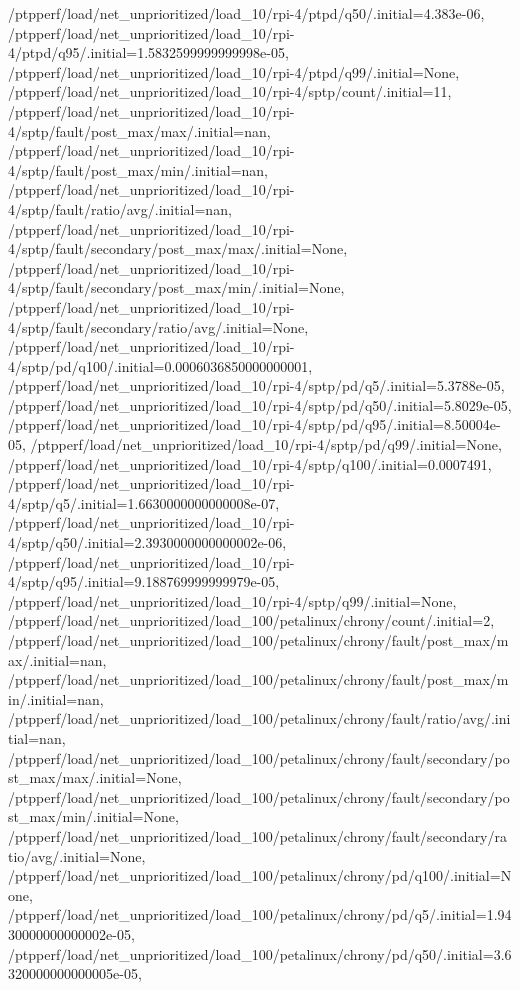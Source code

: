 {    /ptpperf/load/net_unprioritized/load_10/rpi-4/ptpd/q50/.initial=4.383e-06,
    /ptpperf/load/net_unprioritized/load_10/rpi-4/ptpd/q95/.initial=1.5832599999999998e-05,
    /ptpperf/load/net_unprioritized/load_10/rpi-4/ptpd/q99/.initial=None,
    /ptpperf/load/net_unprioritized/load_10/rpi-4/sptp/count/.initial=11,
    /ptpperf/load/net_unprioritized/load_10/rpi-4/sptp/fault/post_max/max/.initial=nan,
    /ptpperf/load/net_unprioritized/load_10/rpi-4/sptp/fault/post_max/min/.initial=nan,
    /ptpperf/load/net_unprioritized/load_10/rpi-4/sptp/fault/ratio/avg/.initial=nan,
    /ptpperf/load/net_unprioritized/load_10/rpi-4/sptp/fault/secondary/post_max/max/.initial=None,
    /ptpperf/load/net_unprioritized/load_10/rpi-4/sptp/fault/secondary/post_max/min/.initial=None,
    /ptpperf/load/net_unprioritized/load_10/rpi-4/sptp/fault/secondary/ratio/avg/.initial=None,
    /ptpperf/load/net_unprioritized/load_10/rpi-4/sptp/pd/q100/.initial=0.0006036850000000001,
    /ptpperf/load/net_unprioritized/load_10/rpi-4/sptp/pd/q5/.initial=5.3788e-05,
    /ptpperf/load/net_unprioritized/load_10/rpi-4/sptp/pd/q50/.initial=5.8029e-05,
    /ptpperf/load/net_unprioritized/load_10/rpi-4/sptp/pd/q95/.initial=8.50004e-05,
    /ptpperf/load/net_unprioritized/load_10/rpi-4/sptp/pd/q99/.initial=None,
    /ptpperf/load/net_unprioritized/load_10/rpi-4/sptp/q100/.initial=0.0007491,
    /ptpperf/load/net_unprioritized/load_10/rpi-4/sptp/q5/.initial=1.6630000000000008e-07,
    /ptpperf/load/net_unprioritized/load_10/rpi-4/sptp/q50/.initial=2.3930000000000002e-06,
    /ptpperf/load/net_unprioritized/load_10/rpi-4/sptp/q95/.initial=9.188769999999979e-05,
    /ptpperf/load/net_unprioritized/load_10/rpi-4/sptp/q99/.initial=None,
    /ptpperf/load/net_unprioritized/load_100/petalinux/chrony/count/.initial=2,
    /ptpperf/load/net_unprioritized/load_100/petalinux/chrony/fault/post_max/max/.initial=nan,
    /ptpperf/load/net_unprioritized/load_100/petalinux/chrony/fault/post_max/min/.initial=nan,
    /ptpperf/load/net_unprioritized/load_100/petalinux/chrony/fault/ratio/avg/.initial=nan,
    /ptpperf/load/net_unprioritized/load_100/petalinux/chrony/fault/secondary/post_max/max/.initial=None,
    /ptpperf/load/net_unprioritized/load_100/petalinux/chrony/fault/secondary/post_max/min/.initial=None,
    /ptpperf/load/net_unprioritized/load_100/petalinux/chrony/fault/secondary/ratio/avg/.initial=None,
    /ptpperf/load/net_unprioritized/load_100/petalinux/chrony/pd/q100/.initial=None,
    /ptpperf/load/net_unprioritized/load_100/petalinux/chrony/pd/q5/.initial=1.9430000000000002e-05,
    /ptpperf/load/net_unprioritized/load_100/petalinux/chrony/pd/q50/.initial=3.6320000000000005e-05,
}
